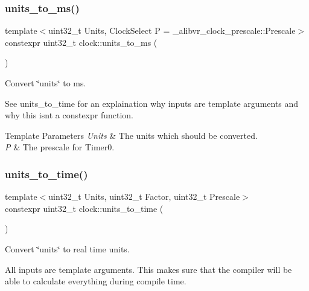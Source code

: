 \subsubsection{\texorpdfstring{units\+\_\+to\+\_\+ms()}{units\_to\_ms()}\hspace{0.1cm}{\footnotesize\ttfamily [2/2]}}
{\footnotesize\ttfamily template$<$uint32\+\_\+t Units, Clock\+Select P = \+\_\+alibvr\+\_\+clock\+\_\+prescale\+::\+Prescale$>$ \\
constexpr uint32\+\_\+t clock\+::units\+\_\+to\+\_\+ms (\begin{DoxyParamCaption}{ }\end{DoxyParamCaption})\hspace{0.3cm}{\ttfamily [inline]}}



Convert \char`\"{}units\char`\"{} to ms. 

See units\+\_\+to\+\_\+time for an explaination why inputs are template arguments and why this isn\textquotesingle{}t a constexpr function.


\begin{DoxyTemplParams}{Template Parameters}
{\em Units} & The units which should be converted. \\
\hline
{\em P} & The prescale for {\ttfamily Timer0}. \\
\hline
\end{DoxyTemplParams}
\hypertarget{namespaceclock_ae4ee0d04356b216b1d04046c0e1b2d38}{}\label{namespaceclock_ae4ee0d04356b216b1d04046c0e1b2d38} 
\subsubsection{\texorpdfstring{units\+\_\+to\+\_\+time()}{units\_to\_time()}\hspace{0.1cm}{\footnotesize\ttfamily [1/2]}}
{\footnotesize\ttfamily template$<$uint32\+\_\+t Units, uint32\+\_\+t Factor, uint32\+\_\+t Prescale$>$ \\
constexpr uint32\+\_\+t clock\+::units\+\_\+to\+\_\+time (\begin{DoxyParamCaption}{ }\end{DoxyParamCaption})}



Convert \char`\"{}units\char`\"{} to real time units. 

All inputs are template arguments. This makes sure that the compiler will be able to calculate everything during compile time.


